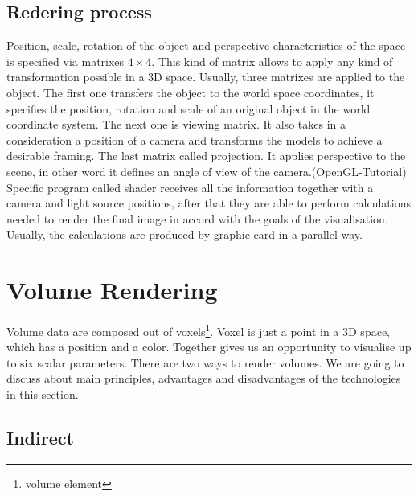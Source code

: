 \documentclass[twoside, english, 11pt]{report}
\begin{document}
\subsection{Redering process}
Position, scale, rotation of the object and perspective characteristics of the space is specified via matrixes $4\times4$. This kind of matrix allows to apply any kind of transformation possible in a 3D space. Usually, three matrixes are applied to the object. The first one transfers the object to the world space coordinates, it specifies the position, rotation and scale of an original object in the world coordinate system. The next one is viewing matrix. It also takes in a consideration a position of a camera and transforms the models to achieve a desirable framing. The last matrix called projection. It applies perspective to the scene, in other word it defines an angle of view of the camera.(OpenGL-Tutorial)\\

Specific program called shader receives all the information together with a camera and light source positions, after that they are able to perform calculations needed to render the final image in accord with the goals of the visualisation. Usually, the calculations are produced by graphic card in a parallel way.

\section{Volume Rendering}

Volume data are composed out of voxels\footnote{volume element}. Voxel is just a point in a 3D space, which has a position and a color. Together gives us an opportunity to visualise up to six scalar parameters. There are two ways to render volumes. We are going to discuss about main principles, advantages and disadvantages of the technologies in this section.\\

\subsection{Indirect}
\end{document}
